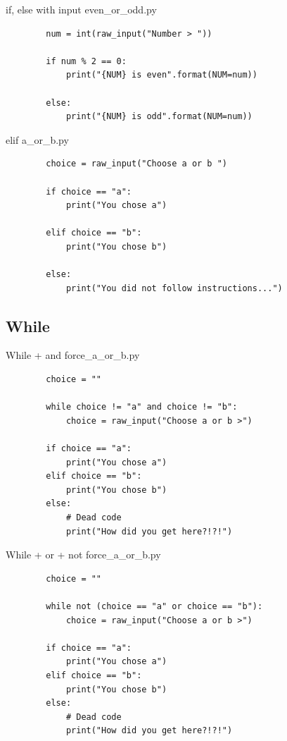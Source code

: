 \documentclass[11pt]{beamer}
\begin{document}
\begin{frame}[fragile]{if, else with input}
	even\_or\_odd.py
	\begin{lstlisting}
		num = int(raw_input("Number > "))
		
		if num % 2 == 0:
		    print("{NUM} is even".format(NUM=num))
		
		else:
		    print("{NUM} is odd".format(NUM=num))
	\end{lstlisting}
\end{frame}

\begin{frame}[fragile]{elif}
	a\_or\_b.py
	\begin{lstlisting}
		choice = raw_input("Choose a or b ")
		
		if choice == "a":
		    print("You chose a")

		elif choice == "b":
		    print("You chose b")
		
		else:
		    print("You did not follow instructions...")
	\end{lstlisting}
\end{frame}

\subsection{While}
\begin{frame}[fragile]{While + and}
	force\_a\_or\_b.py
	\begin{lstlisting}
		choice = ""
		
		while choice != "a" and choice != "b":
			choice = raw_input("Choose a or b >")
		
		if choice == "a":
		    print("You chose a")
		elif choice == "b":
		    print("You chose b")
		else:
		    # Dead code
		    print("How did you get here?!?!")
	\end{lstlisting}
\end{frame}

\begin{frame}[fragile]{While + or + not}
	force\_a\_or\_b.py
	\begin{lstlisting}
		choice = ""
		
		while not (choice == "a" or choice == "b"):
			choice = raw_input("Choose a or b >")
		
		if choice == "a":
		    print("You chose a")
		elif choice == "b":
		    print("You chose b")
		else:
		    # Dead code
		    print("How did you get here?!?!")
	\end{lstlisting}
\end{frame}
\end{document}
